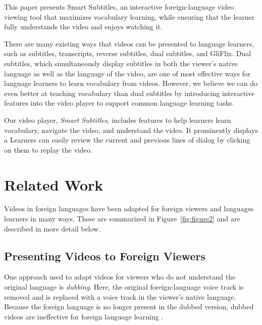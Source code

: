 \documentclass{sigchi}
\begin{document}
This paper presents Smart Subtitles, an interactive
foreign-language video viewing tool
that maximizes vocabulary learning, while ensuring that the learner
fully understands the video and enjoys watching it.

There are many existing ways that videos can be presented to language
learners, such as subtitles, transcripts, reverse subtitles, dual subtitles, and GliFlix.
Dual subtitles, which simultaneously display subtitles in both the viewer's native
language as well as the language of the video,
are one of most effective
ways for language learners to learn vocabulary from videos.
However, we believe we can do even better at teaching vocabulary
than dual subtitles
by introducing interactive features into the video player
to support common language learning tasks.

Our video player, \emph{Smart Subtitles}, includes features to help
learners learn vocabulary, navigate the video, and understand the video.
It prominently displays a 
Learners can easily review the current and previous lines of dialog by clicking on them to replay the video.




\section{Related Work}

Videos in foreign languages have been adapted for foreign viewers and languages learners in many ways. These are summarized in Figure~\ref{fig:figure2} and are described in more detail below.

\subsection{Presenting Videos to Foreign Viewers}

One approach used to adapt videos for viewers who do not understand the original language is \emph{dubbing}. Here, the original foreign-language voice track is removed and is replaced with a voice track in the viewer's native language.
Because the foreign language is no longer present in the dubbed version, dubbed videos are ineffective for foreign language learning \cite{dubbing}.
\end{document}
